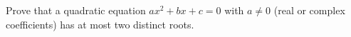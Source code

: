 Prove that a quadratic equation $ax^2+bx+c=0$ with $a\ne0$ (real or complex coefficients) has at most two distinct roots.
